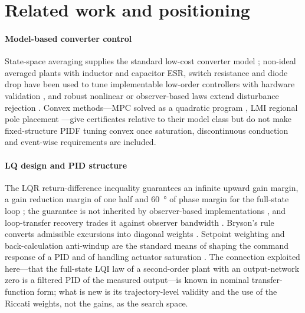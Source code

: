 \section{Related work and positioning}\label{sec:related}

\paragraph{Model-based converter control}
State-space averaging supplies the standard low-cost converter model
\citep{Middlebrook1976,Erickson2020}; non-ideal averaged plants with inductor
and capacitor ESR, switch resistance and diode drop have been used to tune
implementable low-order controllers with hardware validation
\citep{Siddhartha2018}, and robust nonlinear or observer-based laws extend
disturbance rejection \citep{Abdelmalek2020,Sitbon2020,Bouchama2020}.
Convex methods---MPC solved as a quadratic program \citep{Liu2018}, LMI regional
pole placement \citep{Chilali1996}---give certificates relative to their model
class but do not make fixed-structure PIDF tuning convex once saturation,
discontinuous conduction and event-wise requirements are included.

\paragraph{LQ design and PID structure}
The LQR return-difference inequality guarantees an infinite upward gain margin,
a gain reduction margin of one half and \SI{60}{\degree} of phase margin for the
full-state loop \citep{Kalman1964,Safonov1977,Anderson1990}; the guarantee is not
inherited by observer-based implementations \citep{Doyle1978}, and loop-transfer
recovery trades it against observer bandwidth \citep{Doyle1979}. Bryson's rule
converts admissible excursions into diagonal weights \citep{Bryson1975}.
Setpoint weighting and back-calculation anti-windup are the standard means of
shaping the command response of a PID and of handling actuator saturation
\citep{Astrom1989,Astrom2006,Bianchi2008}. The connection exploited here---that
the full-state LQI law of a second-order plant with an output-network zero is
a filtered PID of the measured output---is known in nominal transfer-function
form; what is new is its trajectory-level validity and the use of the Riccati
weights, not the gains, as the search space.

